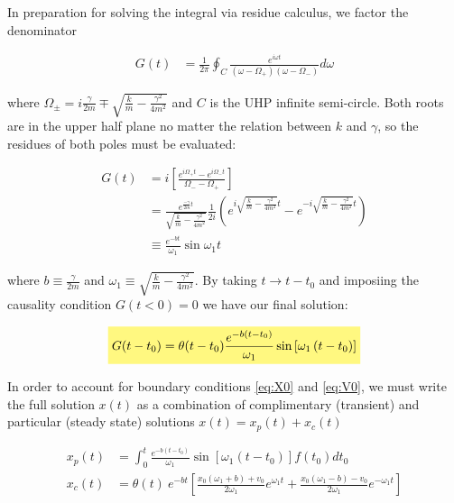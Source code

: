 \documentclass[11pt]{article}
\theoremstyle{plain}
\theoremstyle{definition}
\newcommand{\highlight}[1]{%
  \colorbox{yellow!50}{$\displaystyle#1$}}
\begin{document}
In preparation for solving the integral via residue calculus, we factor the denominator

\begin{align}
    G(t) &= \frac{1}{2\pi}\oint_C \frac{e^{i\omega t}}{\left( \omega-\Omega_+ \right) \left( \omega - \Omega_- \right)} d\omega
\end{align}

where $\Omega_{\pm} = i\frac{\gamma}{2m} \mp \sqrt{\frac{k}{m}-\frac{\gamma^2}{4m^2}}$ and $C$ is the UHP infinite semi-circle.  Both roots are in the upper half plane no matter the relation between $k$ and $\gamma$, so the residues of both poles must be evaluated:

\begin{align}
    G(t) &= i \left[ \frac{e^{i\Omega_+ t} - e^{i \Omega_- t}}{\Omega_- - \Omega_+} \right] \\
    &= \frac{e^{\frac{-\gamma}{2m} t}}{\sqrt{\frac{k}{m}-\frac{\gamma^2}{4m^2}}} \frac{1}{2i} \left( e^{i \sqrt{\frac{k}{m}-\frac{\gamma^2}{4m^2}} t} - e^{-i \sqrt{\frac{k}{m}-\frac{\gamma^2}{4m^2}} t} \right) \\
    &\equiv \frac{e^{-bt}}{\omega_1}\sin{\omega_1 t}
\end{align}

where $b \equiv \frac{\gamma}{2m}$ and $\omega_1 \equiv \sqrt{\frac{k}{m}-\frac{\gamma^2}{4m^2}}$. By taking $t \rightarrow t-t_0$ and imposiing  the causality condition $G(t<0)=0$ we have our final solution:


\begin{align}
    \highlight{G(t-t_0) = \theta(t-t_0) \frac{e^{-b\left( t-t_0 \right)}}{\omega_1}\sin\left[ \omega_1 \left( t-t_0 \right) \right]}
\end{align}

In order to account for boundary conditions \eqref{eq:X0} and \eqref{eq:V0}, we must write the full solution $x(t)$ as a combination of complimentary (transient) and particular (steady state) solutions $x(t) = x_p(t) + x_c(t)$

\begin{align}
    x_p(t) &= \int_{0}^{t} \frac{e^{-b\left( t-t_0 \right)}}{\omega_1}\sin\left[ \omega_1 \left( t-t_0 \right) \right] f(t_0) dt_0 \\
    x_c(t) &=\theta(t) \  e^{-bt}\left[ \frac{x_0\left( \omega_1+b \right)+v_0  }{2\omega_1}e^{\omega_1 t} + \frac{x_0\left( \omega_1-b \right)-v_0  }{2\omega_1}e^{-\omega_1 t} \right]
\end{align}
\end{document}

